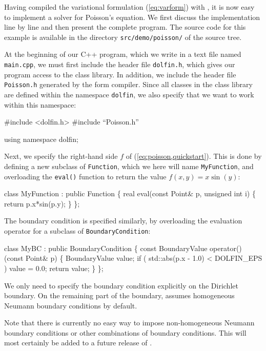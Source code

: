 Having compiled the variational formulation (\ref{eq:varform})
with \ffc{}, it is now easy to implement a solver for Poisson's
equation. We first discuss the implementation line by line and then
present the complete program. The source code for this example is
available in the directory \texttt{src/demo/poisson/} of the \dolfin{}
source tree.

At the beginning of our C++ program, which we write in a text file
named \texttt{main.cpp}, we must first include the header file
\texttt{dolfin.h}, which gives our program access to the \dolfin{}
class library. In addition, we include the header file
\texttt{Poisson.h} generated by the form compiler. Since all classes
in the \dolfin{} class library are defined within the namespace
\texttt{dolfin}, we also specify that we want to work within this
namespace:
\begin{code}
  #include <dolfin.h>
  #include ``Poisson.h''
  
  using namespace dolfin;
\end{code}

Next, we specify the right-hand side $f$ of (\ref{eq:poisson,quickstart}).
This is done by defining a new subclass of \texttt{Function}, which we
here will name \texttt{MyFunction}, and overloading the \texttt{eval()}
function to return the value $f(x, y) = x \sin(y)$:
\begin{code}
  class MyFunction : public Function
  \{
    real eval(const Point& p, unsigned int i)
    \{
      return p.x*sin(p.y);
    \}
  \};
\end{code}

The boundary condition is specified similarly, by overloading the
evaluation operator for a subclass of \texttt{BoundaryCondition}:
\begin{code}
  class MyBC : public BoundaryCondition
  \{
    const BoundaryValue operator() (const Point& p)
    \{
      BoundaryValue value;
      if ( std::abs(p.x - 1.0) < DOLFIN_EPS )
        value = 0.0;
      return value;
    \}
  \};
\end{code}
We only need to specify the boundary condition explicitly on the
Dirichlet boundary. On the remaining part of the boundary, \dolfin{}
assumes homogeneous Neumann boundary conditions by default.

Note that there is currently no easy way to impose non-homogeneous
Neumann boundary conditions or other combinations of boundary
conditions. This will most certainly be added to a future release of
\dolfin{}.

